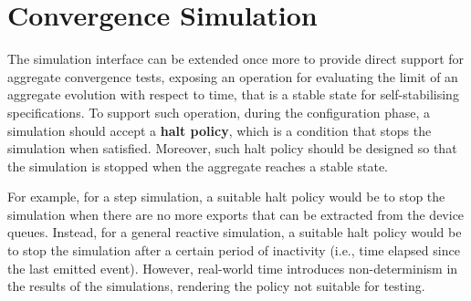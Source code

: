 
\section{Convergence Simulation}
\label{section:design:convergence-simulation}

The simulation interface can be extended once more to provide direct support
for aggregate convergence tests, exposing an operation for evaluating the limit
of an aggregate evolution with respect to time, that is a stable state for
self-stabilising specifications. To support such operation, during the
configuration phase, a simulation should accept a \textbf{halt policy}, which
is a condition that stops the simulation when satisfied. Moreover, such halt
policy should be designed so that the simulation is stopped when the aggregate
reaches a stable state.

For example, for a step simulation, a suitable halt policy would be to stop the
simulation when there are no more exports that can be extracted from the device
queues. Instead, for a general reactive simulation, a suitable halt policy
would be to stop the simulation after a certain period of inactivity (i.e.,
time elapsed since the last emitted event). However, real-world time introduces
non-determinism in the results of the simulations, rendering the policy not
suitable for testing.
